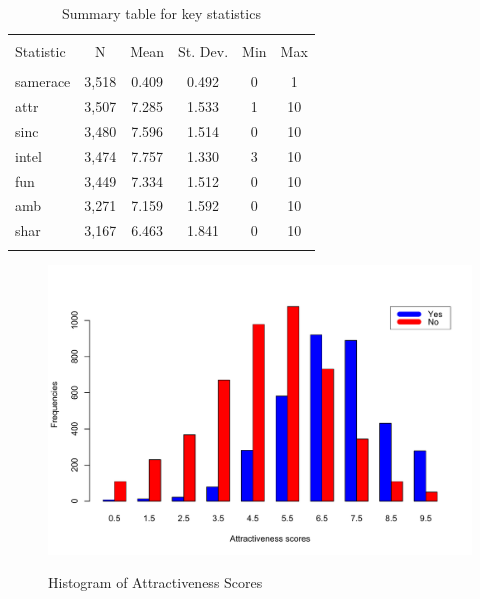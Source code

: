 \documentclass{article}
\begin{document}
\begin{table}[!htbp] \centering 
  \caption{Summary table for key statistics} 
  \label{fig:sum_table} 
\begin{tabular}{@{\extracolsep{5pt}}lccccc} 
\\[-1.8ex]\hline 
\hline \\[-1.8ex] 
Statistic & \multicolumn{1}{c}{N} & \multicolumn{1}{c}{Mean} & \multicolumn{1}{c}{St. Dev.} & \multicolumn{1}{c}{Min} & \multicolumn{1}{c}{Max} \\ 
\hline \\[-1.8ex] 
samerace & 3,518 & 0.409 & 0.492 & 0 & 1 \\ 
attr & 3,507 & 7.285 & 1.533 & 1 & 10 \\ 
sinc & 3,480 & 7.596 & 1.514 & 0 & 10 \\ 
intel & 3,474 & 7.757 & 1.330 & 3 & 10 \\ 
fun & 3,449 & 7.334 & 1.512 & 0 & 10 \\ 
amb & 3,271 & 7.159 & 1.592 & 0 & 10 \\ 
shar & 3,167 & 6.463 & 1.841 & 0 & 10 \\ 
\hline \\[-1.8ex] 
\end{tabular} 
\end{table} 
%
\begin{figure}[H]
	\caption{Histogram of Attractiveness Scores}
	\includegraphics[scale=0.50]{AttractivenessScores}
	\centering
	\label{fig:attractiveness}
\end{figure}
\end{document}
